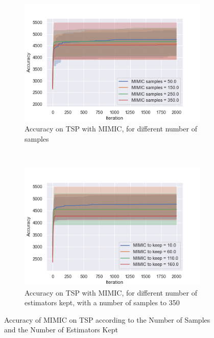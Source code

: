 \documentclass[twocolumn, 10pt]{article}
\begin{document}
				\begin{figure}[h]
					\centering
					\begin{subfigure}[t]{0.45\columnwidth}
						\centering
						\includegraphics[width=\linewidth]{../graphics/tsp_MIMIC_Iteration_Error_MIMIC_samples.png}
						\caption{Accuracy on TSP with MIMIC, for different number of samples}
						\label{tsp:mimic_samples}
					\end{subfigure}
					~
					\begin{subfigure}[t]{0.45\columnwidth}
						\centering
						\includegraphics[width=\linewidth]{../graphics/tsp_MIMIC_Iteration_Error_MIMIC_to_keep.png}
						\caption{Accuracy on TSP with MIMIC, for different number of estimators kept, with a number of samples to 350}
						\label{tsp:mimic_to_keep}
					\end{subfigure}
					\caption{Accuracy of MIMIC on TSP according to the Number of Samples and the Number of Estimators Kept}
					\label{tsp:mimic}
				\end{figure}
\end{document}
